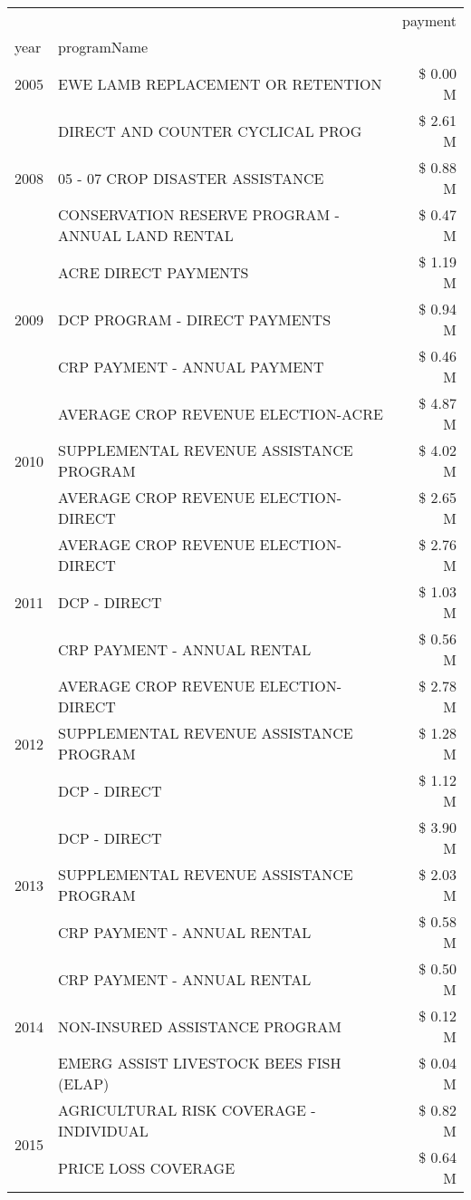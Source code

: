 \begin{tabular}{llr}
\toprule
 &  & payment \\
year & programName &  \\
\midrule
2005 & EWE LAMB REPLACEMENT OR RETENTION & \$ 0.00 M \\
\cline{1-3}
\multirow[t]{3}{*}{2008} & DIRECT AND COUNTER CYCLICAL PROG & \$ 2.61 M \\
 & 05 - 07 CROP DISASTER ASSISTANCE & \$ 0.88 M \\
 & CONSERVATION RESERVE PROGRAM - ANNUAL LAND RENTAL & \$ 0.47 M \\
\cline{1-3}
\multirow[t]{3}{*}{2009} & ACRE DIRECT PAYMENTS & \$ 1.19 M \\
 & DCP PROGRAM - DIRECT PAYMENTS & \$ 0.94 M \\
 & CRP PAYMENT - ANNUAL PAYMENT & \$ 0.46 M \\
\cline{1-3}
\multirow[t]{3}{*}{2010} & AVERAGE CROP REVENUE ELECTION-ACRE & \$ 4.87 M \\
 & SUPPLEMENTAL REVENUE ASSISTANCE PROGRAM & \$ 4.02 M \\
 & AVERAGE CROP REVENUE ELECTION-DIRECT & \$ 2.65 M \\
\cline{1-3}
\multirow[t]{3}{*}{2011} & AVERAGE CROP REVENUE ELECTION-DIRECT & \$ 2.76 M \\
 & DCP - DIRECT & \$ 1.03 M \\
 & CRP PAYMENT - ANNUAL RENTAL & \$ 0.56 M \\
\cline{1-3}
\multirow[t]{3}{*}{2012} & AVERAGE CROP REVENUE ELECTION-DIRECT & \$ 2.78 M \\
 & SUPPLEMENTAL REVENUE ASSISTANCE PROGRAM & \$ 1.28 M \\
 & DCP - DIRECT & \$ 1.12 M \\
\cline{1-3}
\multirow[t]{3}{*}{2013} & DCP - DIRECT & \$ 3.90 M \\
 & SUPPLEMENTAL REVENUE ASSISTANCE PROGRAM & \$ 2.03 M \\
 & CRP PAYMENT - ANNUAL RENTAL & \$ 0.58 M \\
\cline{1-3}
\multirow[t]{3}{*}{2014} & CRP PAYMENT - ANNUAL RENTAL & \$ 0.50 M \\
 & NON-INSURED ASSISTANCE PROGRAM & \$ 0.12 M \\
 & EMERG ASSIST LIVESTOCK BEES FISH (ELAP) & \$ 0.04 M \\
\cline{1-3}
\multirow[t]{3}{*}{2015} & AGRICULTURAL RISK COVERAGE - INDIVIDUAL & \$ 0.82 M \\
 & PRICE LOSS COVERAGE & \$ 0.64 M \\

\end{tabular}
